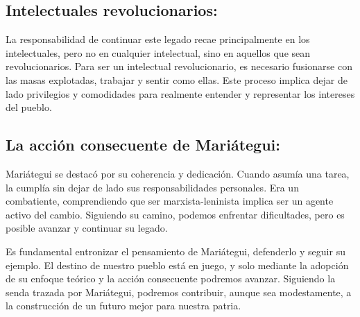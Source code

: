 \documentclass[
  a4paper,
]{article}
\begin{document}
\hypertarget{intelectuales-revolucionarios}{%
\subsection{Intelectuales
revolucionarios:}\label{intelectuales-revolucionarios}}

La responsabilidad de continuar este legado recae principalmente en los
intelectuales, pero no en cualquier intelectual, sino en aquellos que
sean revolucionarios. Para ser un intelectual revolucionario, es
necesario fusionarse con las masas explotadas, trabajar y sentir como
ellas. Este proceso implica dejar de lado privilegios y comodidades para
realmente entender y representar los intereses del pueblo.

\hypertarget{la-acciuxf3n-consecuente-de-mariuxe1tegui}{%
\subsection{La acción consecuente de
Mariátegui:}\label{la-acciuxf3n-consecuente-de-mariuxe1tegui}}

Mariátegui se destacó por su coherencia y dedicación. Cuando asumía una
tarea, la cumplía sin dejar de lado sus responsabilidades personales.
Era un combatiente, comprendiendo que ser marxista-leninista implica ser
un agente activo del cambio. Siguiendo su camino, podemos enfrentar
dificultades, pero es posible avanzar y continuar su legado.

Es fundamental entronizar el pensamiento de Mariátegui, defenderlo y
seguir su ejemplo. El destino de nuestro pueblo está en juego, y solo
mediante la adopción de su enfoque teórico y la acción consecuente
podremos avanzar. Siguiendo la senda trazada por Mariátegui, podremos
contribuir, aunque sea modestamente, a la construcción de un futuro
mejor para nuestra patria.


\printbibliography
\end{document}
